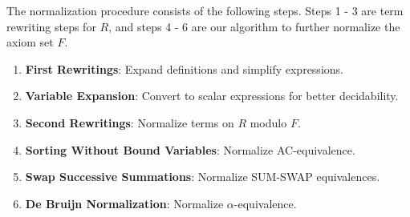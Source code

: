
The normalization procedure consists of the following steps. Steps 1 - 3 are term rewriting steps for $R$, and steps 4 - 6 are our algorithm to further normalize the axiom set $F$.
\begin{enumerate}
    \item \textbf{First Rewritings}: Expand definitions and simplify expressions.
    \item \textbf{Variable Expansion}: Convert to scalar expressions for better decidability.
    \item \textbf{Second Rewritings}: Normalize terms on \( R \) modulo \( F \).
    \item \textbf{Sorting Without Bound Variables}: Normalize AC-equivalence.
    \item \textbf{Swap Successive Summations}: Normalize SUM-SWAP equivalences.
    \item \textbf{De Bruijn Normalization}: Normalize \( \alpha \)-equivalence.
\end{enumerate}



